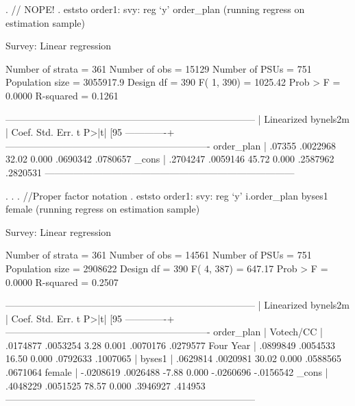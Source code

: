 \documentclass[12 pt]{article}
\begin{document}
\begin{stlog}

. // NOPE!
. eststo order1: svy: reg `y' order_plan
(running regress on estimation sample)

Survey: Linear regression

Number of strata   =       361                  Number of obs      =     15129
Number of PSUs     =       751                  Population size    = 3055917.9
                                                Design df          =       390
                                                F(   1,    390)    =   1025.42
                                                Prob > F           =    0.0000
                                                R-squared          =    0.1261

------------------------------------------------------------------------------
             |             Linearized
    bynels2m |      Coef.   Std. Err.      t    P>|t|     [95%
-------------+----------------------------------------------------------------
  order_plan |     .07355   .0022968    32.02   0.000     .0690342    .0780657
       _cons |   .2704247   .0059146    45.72   0.000     .2587962    .2820531
------------------------------------------------------------------------------

. 
. 
. //Proper factor notation
. eststo order1: svy: reg `y' i.order_plan byses1 female
(running regress on estimation sample)

Survey: Linear regression

Number of strata   =       361                  Number of obs      =     14561
Number of PSUs     =       751                  Population size    =   2908622
                                                Design df          =       390
                                                F(   4,    387)    =    647.17
                                                Prob > F           =    0.0000
                                                R-squared          =    0.2507

------------------------------------------------------------------------------
             |             Linearized
    bynels2m |      Coef.   Std. Err.      t    P>|t|     [95%
-------------+----------------------------------------------------------------
  order_plan |
  Votech/CC  |   .0174877   .0053254     3.28   0.001     .0070176    .0279577
  Four Year  |   .0899849   .0054533    16.50   0.000     .0792633    .1007065
             |
      byses1 |   .0629814   .0020981    30.02   0.000     .0588565    .0671064
      female |  -.0208619   .0026488    -7.88   0.000    -.0260696   -.0156542
       _cons |   .4048229   .0051525    78.57   0.000     .3946927     .414953
------------------------------------------------------------------------------


\end{stlog}
\end{document}
